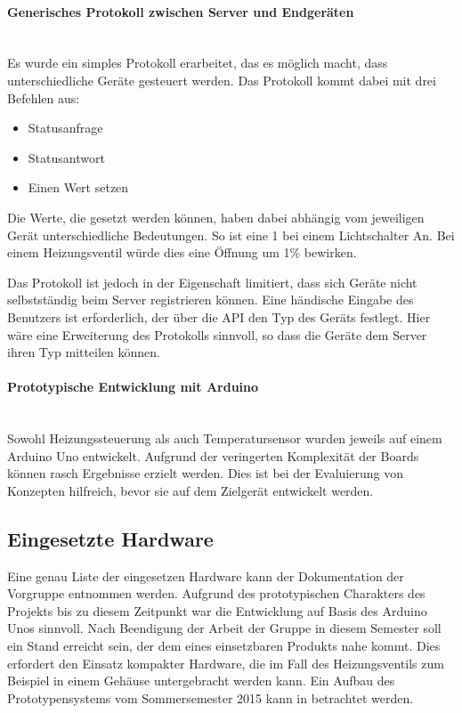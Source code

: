 \paragraph{Generisches Protokoll zwischen Server und Endgeräten}\label{AusgProt}\mbox{}\\
Es wurde ein simples Protokoll erarbeitet, das es möglich macht, dass unterschiedliche Geräte gesteuert werden. Das Protokoll kommt dabei mit drei Befehlen aus:
\begin{itemize}
\item Statusanfrage
\item Statusantwort
\item Einen Wert setzen
\end{itemize}

Die Werte, die gesetzt werden können, haben dabei abhängig vom jeweiligen Gerät unterschiedliche Bedeutungen. So ist eine 1 bei einem Lichtschalter An. Bei einem Heizungsventil würde dies eine Öffnung um 1\% bewirken.

Das Protokoll ist jedoch in der Eigenschaft limitiert, dass sich Geräte nicht selbstständig beim Server registrieren können. Eine händische Eingabe des Benutzers ist erforderlich, der über die API den Typ des Geräts festlegt. Hier wäre eine Erweiterung des Protokolls sinnvoll, so dass die Geräte dem Server ihren Typ mitteilen können.

\paragraph{Prototypische Entwicklung mit Arduino}\mbox{}\\
Sowohl Heizungssteuerung als auch Temperatursensor wurden jeweils auf einem Arduino Uno entwickelt. Aufgrund der veringerten Komplexität der Boards können rasch Ergebnisse erzielt werden. Dies ist bei der Evaluierung von Konzepten hilfreich, bevor sie auf dem Zielgerät entwickelt werden.

\subsection{Eingesetzte Hardware}
Eine genau Liste der eingesetzen Hardware kann der Dokumentation der Vorgruppe entnommen werden. Aufgrund des prototypischen Charakters des Projekts bis zu diesem Zeitpunkt war die Entwicklung auf Basis des Arduino Unos sinnvoll. Nach Beendigung der Arbeit der Gruppe in diesem Semester soll ein Stand erreicht sein, der dem eines einsetzbaren Produkts nahe kommt. Dies erfordert den Einsatz kompakter Hardware, die im Fall des Heizungsventils zum Beispiel in einem Gehäuse untergebracht werden kann.
Ein Aufbau des Prototypensystems vom Sommersemester 2015 kann in  betrachtet werden.

